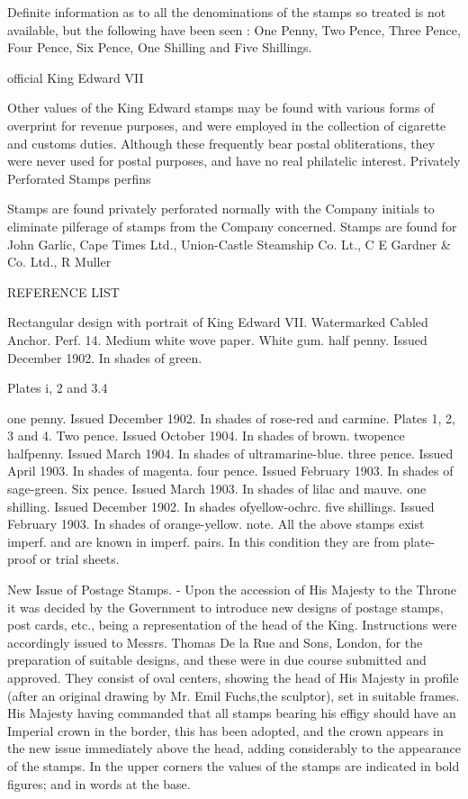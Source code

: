 Definite information as to all the denominations of the stamps so treated is not available, but the following have been seen : One Penny, Two Pence, Three Pence, Four Pence, Six Pence, One Shilling and Five Shillings.


official King Edward VII
 

Other values of the King Edward stamps may be found with various forms of overprint for revenue purposes, and were employed in the collection of cigarette and customs duties. Although these frequently bear postal obliterations, they were never used for postal purposes, and have no real philatelic interest.
Privately Perforated Stamps
perfins
 

Stamps are found privately perforated normally with the Company initials to eliminate pilferage of stamps from the Company concerned.
Stamps are found for John Garlic, Cape Times Ltd., Union-Castle Steamship Co. Lt., C E Gardner \& Co. Ltd., R Muller

 

 
REFERENCE LIST

Rectangular design with portrait of King Edward VII. Watermarked Cabled Anchor. Perf. 14.  Medium white wove paper.  White gum.
half penny. Issued December 1902. In shades of green.


Plates i, 2 and 3.4


one penny. Issued December 1902. In shades of rose-red and carmine. Plates 1, 2, 3 and 4.
Two pence. Issued October 1904. In shades of brown.
twopence halfpenny. Issued March 1904. In shades of ultramarine-blue.
three pence. Issued April 1903. In shades of magenta.
four pence. Issued February 1903. In shades of sage-green.
Six pence. Issued March 1903. In shades of lilac and mauve.
one shilling. Issued December 1902. In shades ofyellow-ochrc.
five shillings. Issued February 1903. In shades of orange-yellow.
note. All the above stamps exist imperf. and are known in imperf. pairs. In this condition they are from plate-proof or trial sheets.

New Issue of Postage Stamps. - Upon the accession of His Majesty to the Throne it was decided by the Government to introduce new designs of postage stamps, post cards, etc., being a representation of the head of the King. Instructions were
accordingly issued to Messrs. Thomas De la Rue and Sons, London, for the preparation of suitable designs, and these were in due course submitted and approved. They consist of oval centers, showing the head of His Majesty in profile (after an original drawing by Mr. Emil Fuchs,the sculptor), set in suitable frames. His Majesty having commanded that all stamps bearing his effigy should have an
Imperial crown in the border, this has been adopted, and the crown appears in the new issue immediately above the head, adding considerably to the appearance of the stamps. In the upper corners the values of the stamps are indicated in bold
figures; and in words at the base.


